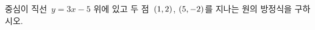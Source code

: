 중심이 직선~$y=3x-5$ 위에 있고 두 점~$(1{,}\mkern3mu\mathopen{}2)$, $(5{,}\mkern3mu\mathopen{}-2)$를 지나는 원의 방정식을 구하시오.
